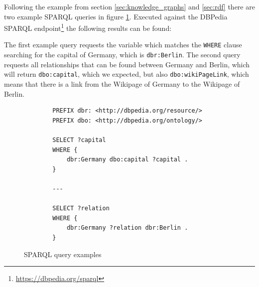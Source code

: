 Following the example from section \ref{sec:knowledge_graphs} and \ref{sec:rdf} there are two example SPARQL queries in figure \ref{fig:sparql_example}.
Executed against the DBPedia SPARQL endpoint\footnote{\url{https://dbpedia.org/sparql}} the following results can be found:

The first example query requests the variable which matches the \texttt{WHERE} clause searching for the capital of Germany, which is \texttt{dbr:Berlin}.
The second query requests all relationships that can be found between Germany and Berlin, which will return \texttt{dbo:capital}, which we expected, but also \texttt{dbo:wikiPageLink}, which means that there is a link from the Wikipage of Germany to the Wikipage of Berlin.

\begin{figure}[tbph]
	\begin{lstlisting}
		PREFIX dbr: <http://dbpedia.org/resource/>
		PREFIX dbo: <http://dbpedia.org/ontology/>
		
		SELECT ?capital
		WHERE {
			dbr:Germany dbo:capital ?capital .
		}
		
		---
		
		SELECT ?relation
		WHERE {
			dbr:Germany ?relation dbr:Berlin .
		}
	\end{lstlisting}
	\caption{SPARQL query examples}
	\label{fig:sparql_example}
\end{figure}